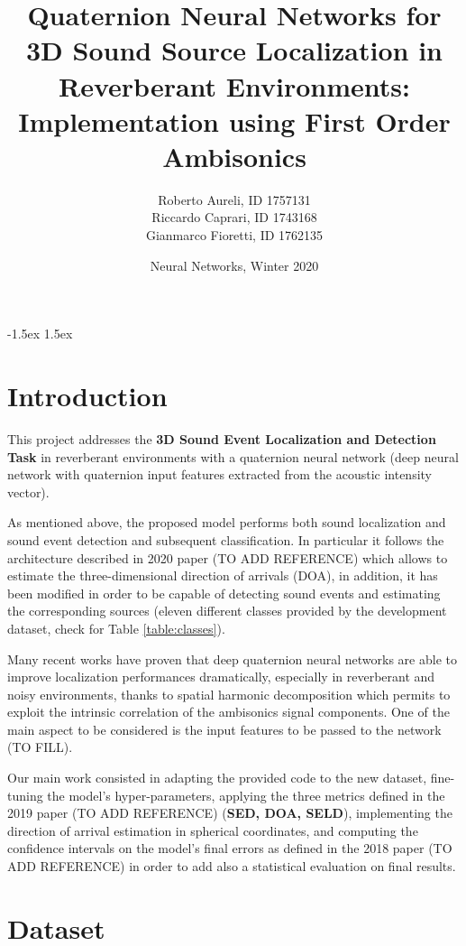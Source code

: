 \documentclass[11pt]{article}
\title{Quaternion Neural Networks for 3D Sound Source Localization in Reverberant Environments: Implementation using First Order Ambisonics}
\author{Roberto Aureli, ID 1757131\\
		Riccardo Caprari, ID 1743168\\
		Gianmarco Fioretti, ID 1762135}
\date{Neural Networks, Winter 2020}
\begin{document}
\maketitle

\vspace{10px}

\openup -1.5ex
\tableofcontents
\openup 1.5ex

\newpage
\section{Introduction}\label{cha:intro}

This project addresses the \textbf{3D Sound Event Localization and Detection Task} in reverberant environments with a  quaternion neural network (deep neural network with quaternion input features extracted from the acoustic intensity vector).\newline

As mentioned above, the proposed model performs both sound localization and sound event detection and subsequent classification. In particular it follows the architecture described in 2020 paper (TO ADD REFERENCE) which allows to estimate the three-dimensional direction of arrivals (DOA), in addition, it has been modified in order to be capable of detecting sound events and estimating the corresponding sources (eleven different classes provided by the development dataset, check for Table \ref{table:classes}).\newline

Many recent works have proven that deep quaternion neural networks are able to improve localization performances dramatically, especially in reverberant and noisy environments, thanks to spatial harmonic decomposition which permits to exploit the intrinsic correlation of the ambisonics signal components. One of the main aspect to be considered is the input features to be passed to the network (TO FILL).\newline

Our main work consisted in adapting the provided code to the new dataset, fine-tuning the model's hyper-parameters, applying the three metrics defined in the 2019 paper  (TO ADD REFERENCE) (\textbf{SED, DOA, SELD}), implementing the direction of arrival estimation in spherical coordinates, and computing the confidence intervals on the model's final errors as defined in the 2018 paper (TO ADD REFERENCE) in order to add also a statistical evaluation on final results.

\newpage
\section{Dataset}\label{cha:data}
\end{document}
